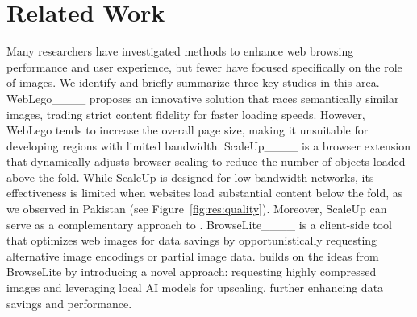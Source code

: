 \section{Related Work}
\label{sec:related}
Many researchers have investigated methods to enhance web browsing performance and user experience, but fewer have focused specifically on the role of images. We identify and briefly summarize three key studies in this area. WebLego____ proposes an innovative solution that races semantically similar images, trading strict content fidelity for faster loading speeds. However, WebLego tends to increase the overall page size, making it unsuitable for developing regions with limited bandwidth. ScaleUp____ is a browser extension that dynamically adjusts browser scaling to reduce the number of objects loaded above the fold. While ScaleUp is designed for low-bandwidth networks, its effectiveness is limited when websites load substantial content below the fold, as we observed in Pakistan (see Figure~\ref{fig:res:quality}). Moreover, ScaleUp can serve as a complementary approach to \tool. BrowseLite____ is a client-side tool that optimizes web images for data savings by opportunistically requesting alternative image encodings or partial image data. \tool builds on the ideas from BrowseLite by introducing a novel approach: requesting highly compressed images and leveraging local AI models for upscaling, further enhancing data savings and performance.